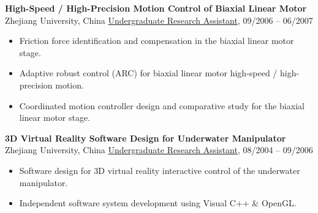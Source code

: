 \documentclass{res}
\begin{document}
\begin{resume}
{\bf High-Speed / High-Precision Motion Control of Biaxial Linear Motor}  \\
Zhejiang University, China  \hfill \underline{Undergraduate Research Assistant}, 09/2006 -- 06/2007
\begin{itemize}
	\item Friction force identification and compensation in the biaxial linear motor stage.
	\item Adaptive robust control (ARC) for biaxial linear motor high-speed / high-precision motion.
	\item Coordinated motion controller design and comparative study for the biaxial linear motor stage.
\end{itemize}

{\bf 3D Virtual Reality Software Design for Underwater Manipulator}  \\
Zhejiang University, China  \hfill \underline{Undergraduate Research Assistant}, 08/2004 -- 09/2006

\begin{itemize}
	\item Software design for 3D virtual reality interactive control of the underwater manipulator.
	\item Independent software system development using Visual C++ \& OpenGL.
\end{itemize}

%


\end{resume}
\end{document}
